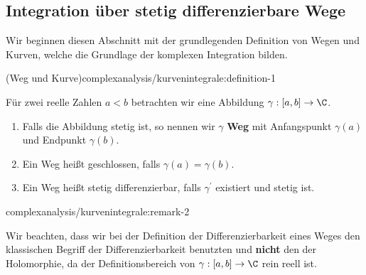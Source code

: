 \documentclass[letterpaper,10pt,german]{jupyterBook}
\begin{document}
\subsection{Integration über stetig differenzierbare Wege}
\label{\detokenize{complexanalysis/kurvenintegrale:integration-uber-stetig-differenzierbare-wege}}
\par
Wir beginnen diesen Abschnitt mit der grundlegenden Definition von Wegen und Kurven, welche die Grundlage der komplexen Integration bilden.
\begin{definition}{(Weg und Kurve)}{complexanalysis/kurvenintegrale:definition-1}



\par
Für zwei reelle Zahlen \(a<b\) betrachten wir eine Abbildung \(\gamma:[a,b]\to\C\).
\begin{enumerate}

\item {} 
\par
Falls die Abbildung stetig ist, so nennen wir \(\gamma\) \textbf{Weg} mit Anfangspunkt \(\gamma(a)\) und Endpunkt \(\gamma(b)\).

\item {} 
\par
Ein Weg heißt geschlossen, falls \(\gamma(a)=\gamma(b)\).

\item {} 
\par
Ein Weg heißt stetig differenzierbar, falls \(\gamma^\prime\) existiert und stetig ist.

\end{enumerate}
\end{definition}
\begin{remark}{}{complexanalysis/kurvenintegrale:remark-2}



\par
Wir beachten, dass wir bei der Definition der Differenzierbarkeit eines Weges den klassischen Begriff der Differenzierbarkeit benutzten und \textbf{nicht} den der Holomorphie, da der Definitionsbereich von \(\gamma:[a,b]\to\C\) rein reell ist.
\end{remark}
\end{document}
